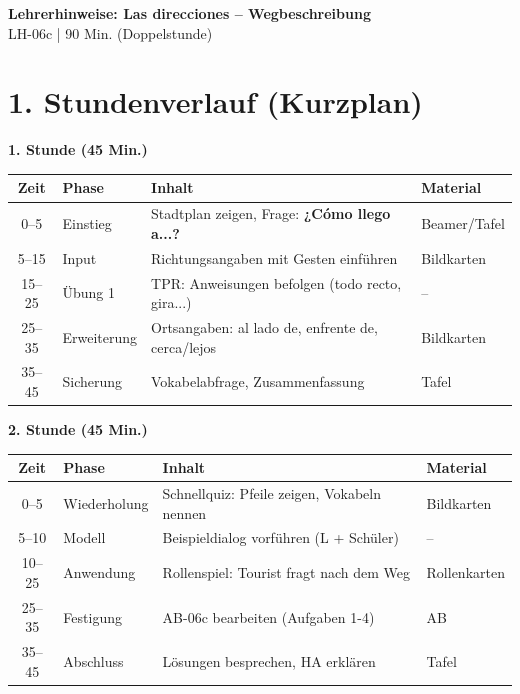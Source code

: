 \documentclass[11pt, a4paper]{article}
\newcommand{\fachfarbe}{spanisch}
\newcommand{\thema}{Las direcciones -- Wegbeschreibung}
\newcommand{\sequenz}{06}
\newcommand{\block}{c}
\newcommand{\dauer}{90 Min. (Doppelstunde)}
\newcommand{\es}[1]{\textcolor{\fachfarbe}{\textbf{#1}}}
\begin{document}

\begin{center}
    {\Large\bfseries\textcolor{\fachfarbe}{Lehrerhinweise: \thema}}\\[0.3em]
    {\normalsize LH-\sequenz\block{} | \dauer}
\end{center}

\vspace{10pt}


\section*{1. Stundenverlauf (Kurzplan)}

\textbf{1. Stunde (45 Min.)}

\begin{tabularx}{\textwidth}{|c|l|X|l|}
\hline
\textbf{Zeit} & \textbf{Phase} & \textbf{Inhalt} & \textbf{Material} \\
\hline
0--5 & Einstieg & Stadtplan zeigen, Frage: \es{¿Cómo llego a...?} & Beamer/Tafel \\
\hline
5--15 & Input & Richtungsangaben mit Gesten einführen & Bildkarten \\
\hline
15--25 & Übung 1 & TPR: Anweisungen befolgen (todo recto, gira...) & -- \\
\hline
25--35 & Erweiterung & Ortsangaben: al lado de, enfrente de, cerca/lejos & Bildkarten \\
\hline
35--45 & Sicherung & Vokabelabfrage, Zusammenfassung & Tafel \\
\hline
\end{tabularx}

\vspace{1em}

\textbf{2. Stunde (45 Min.)}

\begin{tabularx}{\textwidth}{|c|l|X|l|}
\hline
\textbf{Zeit} & \textbf{Phase} & \textbf{Inhalt} & \textbf{Material} \\
\hline
0--5 & Wiederholung & Schnellquiz: Pfeile zeigen, Vokabeln nennen & Bildkarten \\
\hline
5--10 & Modell & Beispieldialog vorführen (L + Schüler) & -- \\
\hline
10--25 & Anwendung & Rollenspiel: Tourist fragt nach dem Weg & Rollenkarten \\
\hline
25--35 & Festigung & AB-06c bearbeiten (Aufgaben 1-4) & AB \\
\hline
35--45 & Abschluss & Lösungen besprechen, HA erklären & Tafel \\
\hline
\end{tabularx}
\end{document}

